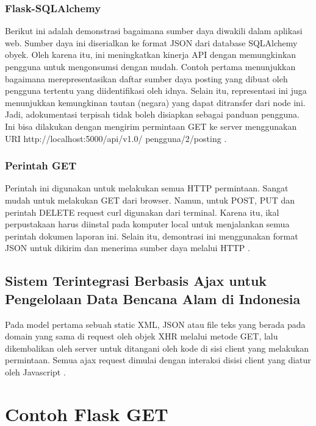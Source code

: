 \subsubsection{Flask-SQLAlchemy}
Berikut ini adalah demonstrasi bagaimana sumber daya diwakili dalam aplikasi web.
Sumber daya ini diserialkan ke format JSON dari database SQLAlchemy obyek. Oleh karena itu, ini meningkatkan kinerja API dengan memungkinkan pengguna untuk mengonsumsi dengan mudah. Contoh pertama menunjukkan bagaimana merepresentasikan daftar sumber daya posting yang dibuat oleh pengguna tertentu yang diidentifikasi oleh idnya. Selain itu, representasi ini juga menunjukkan kemungkinan tautan (negara) yang dapat ditransfer dari node ini. Jadi, adokumentasi terpisah tidak boleh disiapkan sebagai panduan pengguna. Ini bisa dilakukan dengan mengirim permintaan GET ke server menggunakan URI http://localhost:5000/api/v1.0/ pengguna/2/posting \cite{alemu2014rest}.
\subsubsection{Perintah GET}
Perintah ini digunakan untuk melakukan semua HTTP permintaan. Sangat mudah untuk melakukan GET dari browser. Namun, untuk POST, PUT dan perintah DELETE request curl digunakan dari terminal. Karena itu, ikal perpustakaan harus diinstal pada komputer local untuk menjalankan semua perintah dokumen laporan ini. Selain itu, demontrasi ini menggunakan format JSON untuk dikirim dan menerima sumber daya melalui HTTP \cite{alemu2014rest}.
\subsection{Sistem Terintegrasi Berbasis Ajax untuk Pengelolaan Data Bencana Alam di Indonesia}
Pada model pertama sebuah static XML, JSON atau file teks yang berada pada domain yang sama di request oleh objek XHR melalui metode GET, lalu dikembalikan oleh server untuk ditangani oleh kode di sisi client yang melakukan permintaan. Semua ajax request dimulai dengan interaksi disisi client yang diatur oleh Javascript \cite{prasetyo2007sistem}.

\section{Contoh Flask GET}
